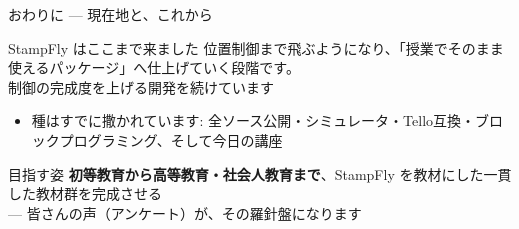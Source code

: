 \begin{frame}{おわりに --- 現在地と、これから}
  \begin{block}{StampFly はここまで来ました}
    \small 位置制御まで飛ぶようになり、「授業でそのまま使えるパッケージ」へ仕上げていく段階です。\\
    制御の完成度を上げる開発を続けています
  \end{block}

  \vspace{0.3em}

  \begin{itemize}\small
    \item 種はすでに撒かれています: 全ソース公開・シミュレータ・Tello互換・ブロックプログラミング、そして今日の講座
  \end{itemize}

  \vspace{0.2em}

  \begin{exampleblock}{目指す姿}
    \small \textbf{初等教育から高等教育・社会人教育まで}、StampFly を教材にした一貫した教材群を完成させる\\
    --- 皆さんの声（アンケート）が、その羅針盤になります
  \end{exampleblock}
\end{frame}


